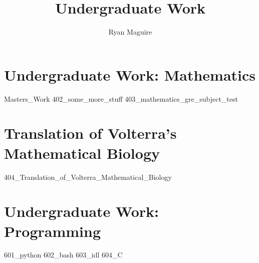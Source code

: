 \documentclass[crop=false,class=book,oneside]{standalone}
\begin{document}
    \newif\ifwork
    \ifstandalone
        \title{Undergraduate Work}
        \author{Ryan Maguire}
        \date{\vspace{-5ex}}
        \maketitle
        \tableofcontents
        \listoffigures
        \listoftables
        \clearpage
    \fi
    \part{Undergraduate Work: Mathematics}
        {Masters_Work}
        {402_some_more_stuff}
        {403_mathematics_gre_subject_test}
    \part{Translation of Volterra's Mathematical Biology}
        {404_Translation_of_Volterra_Mathematical_Biology}
    \part{Undergraduate Work: Programming}
        {601_python}
        {602_bash}
        {603_idl}
        {604_C}
\end{document}

